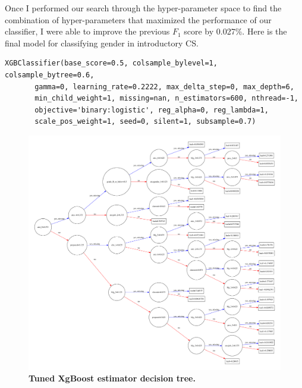 Once I performed our search through the hyper-parameter space to find the combination of hyper-parameters that maximized the performance of our classifier, I were able to improve the previous $F_1$ score by 0.027\%. Here is the final model for classifying gender in introductory CS. 
\begin{verbatim}
XGBClassifier(base_score=0.5, colsample_bylevel=1, colsample_bytree=0.6,
       gamma=0, learning_rate=0.2222, max_delta_step=0, max_depth=6,
       min_child_weight=1, missing=nan, n_estimators=600, nthread=-1,
       objective='binary:logistic', reg_alpha=0, reg_lambda=1,
       scale_pos_weight=1, seed=0, silent=1, subsample=0.7)
\end{verbatim}

\begin{figure}[!hbtp]
\centering
    \includegraphics[width=1\textwidth]{figures/Tuned_model_graph}
    \caption{\textbf{Tuned XgBoost estimator decision tree. }\textit{}}\label{tuned_plot_tree}
\end{figure}

